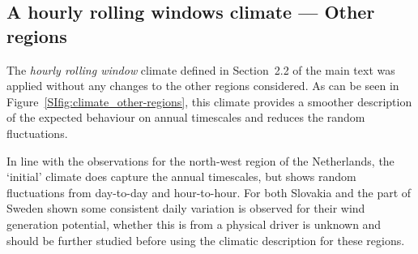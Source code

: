 \documentclass[12pt]{iopart}
\begin{document}
\subsection{A hourly rolling windows climate --- Other regions}
The \emph{hourly rolling window} climate defined in Section~2.2 of the main text was applied without any changes to the other regions considered.
As can be seen in Figure~\ref{SIfig:climate_other-regions}, this climate provides a smoother description of the expected behaviour on annual timescales and reduces the random fluctuations. 

In line with the observations for the north-west region of the Netherlands, the `initial' climate does capture the annual timescales, but shows random fluctuations from day-to-day and hour-to-hour. 
For both Slovakia and the part of Sweden shown some consistent daily variation is observed for their wind generation potential, whether this is from a physical driver is unknown and should be further studied before using the climatic description for these regions.
\end{document}
